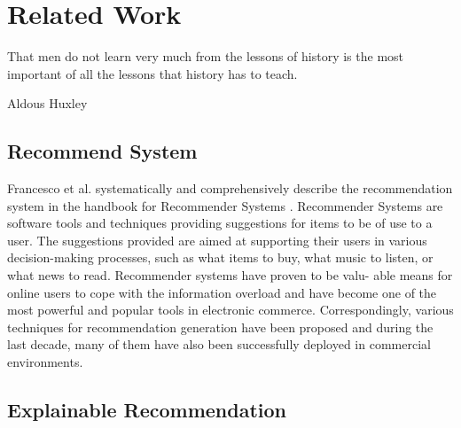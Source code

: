 \section{Related Work}
\label{ch:related-work}

\epigraph{That men do not learn very much from the lessons of history is the most important of all the lessons that history has to teach.}{Aldous Huxley}

\subsection{Recommend System}
Francesco et al. systematically and comprehensively describe the recommendation system in the handbook for Recommender Systems \cite{ricci2011introduction}. Recommender Systems are software tools and techniques providing suggestions for items to be of use to a user. The suggestions provided are aimed at supporting their users in various decision-making processes, such as what items to buy, what music to listen, or what news to read. Recommender systems have proven to be valu- able means for online users to cope with the information overload and have become one of the most powerful and popular tools in electronic commerce. Correspondingly, various techniques for recommendation generation have been proposed and during the last decade, many of them have also been successfully deployed in commercial environments.

\subsection{Explainable Recommendation}
